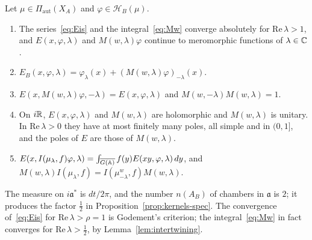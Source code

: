 \begin{theorem}\label{thm:eisenstein}
Let $\mu\in\Pi_{\mathrm{aut}}(X_A)$ and $\varphi\in\mathcal H_B(\mu)$.
\begin{enumerate}[label=(\alph*)]
\item The series~\eqref{eq:Eis} and the integral~\eqref{eq:Mw} converge
  absolutely for $\mathrm{Re}\,\lambda>1$, and $E(x,\varphi,\lambda)$
  and $M(w,\lambda)\varphi$ continue to meromorphic functions of
  $\lambda\in\mathbb{C}$.
\item $E_B(x,\varphi,\lambda)=\varphi_\lambda(x)+(M(w,\lambda)
  \varphi)_{-\lambda}(x)$.
\item $E(x,M(w,\lambda)\varphi,-\lambda)=E(x,\varphi,\lambda)$ and
  $M(w,-\lambda)M(w,\lambda)=1$.
\item On $i\mathbb{R}$, $E(x,\varphi,\lambda)$ and $M(w,\lambda)$ are holomorphic
  and $M(w,\lambda)$ is unitary. In $\mathrm{Re}\,\lambda>0$ they have at
  most finitely many poles, all simple and in $(0,1]$, and the poles of
  $E$ are those of $M(w,\lambda)$.
\item $E(x,I(\mu_\lambda,f)\varphi,\lambda)=\int_{\overline{G(\mathbb{A})}}f(y)
  E(xy,\varphi,\lambda)\,dy$, and $M(w,\lambda)I(\mu_\lambda,f)=
  I(\mu^w_{-\lambda},f)M(w,\lambda)$.
\end{enumerate}
\end{theorem}

The measure on $i\mathfrak a^*$ is $dt/2\pi$, and the number $n(A_B)$ of
chambers in $\mathfrak a$ is $2$; it produces the factor $\frac12$ in
Proposition~\ref{prop:kernels-spec}. The convergence of~\eqref{eq:Eis} for $\mathrm{Re}\,\lambda>\rho=1$ is
Godement's criterion; the integral~\eqref{eq:Mw} in fact converges for
$\mathrm{Re}\,\lambda>\frac12$, by Lemma~\ref{lem:intertwining}.

